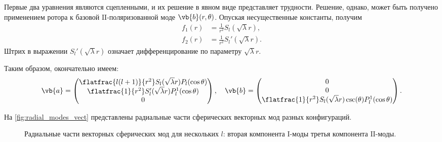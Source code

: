     Первые два уравнения являются сцепленными, и их решение в явном виде представляет трудности. Решение, однако, может быть получено применением ротора к базовой $\mathrm{II}$-поляризованной моде $\vb{b}(r,\theta)$. Опуская несущественные константы, получим
    \begin{equation}\begin{aligned}
        f_1(r) &= \frac{1}{r^2} S_l(\sqrt\lambda r), \\
        f_2(r) &= \frac{1}{r^2} S_l'(\sqrt\lambda r) .
    \end{aligned}\end{equation}
    Штрих в выражении $S_l'(\sqrt\lambda r)$ означает дифференцирование по параметру $\sqrt\lambda r$.

    Таким образом, окончательно имеем:
    \begin{equation}
        \vb{a} = \begin{pmatrix}
            \flatfrac{l(l+1)}{r^2} S_l(\sqrt\lambda r) P_l(\cos\theta) \\
            \flatfrac{1}{r^2} S_l'(\sqrt\lambda r) P_l^1(\cos\theta) \\
            0
        \end{pmatrix} , \quad
        \vb{b} = \begin{pmatrix}
            0 \\
            0 \\
            \flatfrac{1}{r^2} S_l(\sqrt\lambda r) \csc(\theta) P_l^1(\cos\theta)
        \end{pmatrix} .
    \end{equation}

    На \autoref{fig:radial_modes_vect} представлены радиальные части сферических векторных мод разных конфигураций.
    \begin{figure}[h]
        \centering
        \hspace{8pt}%
        \hspace{8pt}%
        \caption[]{Радиальные части векторных сферических мод для нескольких $l$: %
             вторая компонента $\mathrm{I}$-моды %
             третья компонента $\mathrm{II}$-моды. %
        } %
        \label{fig:radial_modes_vect}%
    \end{figure}

